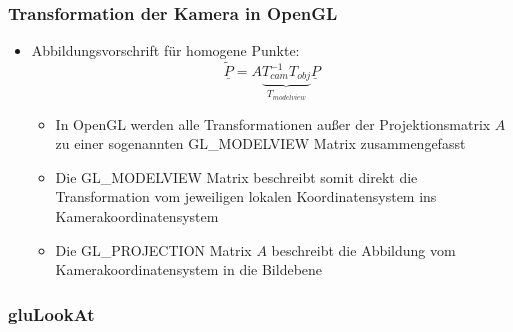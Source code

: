 \documentclass{scrartcl}
\begin{document}
\subsubsection{Transformation der Kamera in OpenGL}

\begin{itemize}
	\item Abbildungsvorschrift für homogene Punkte:
	\begin{equation}
		\underline{\widetilde{P}} = A  \underbrace{T_{cam}^{-1} T_{obj}}_{T_{modelview}}  \underline{P}
	\end{equation}
	\begin{itemize}
		\item In OpenGL werden alle Transformationen außer der Projektionsmatrix $A$ zu einer sogenannten GL\_MODELVIEW Matrix zusammengefasst
		\item Die GL\_MODELVIEW Matrix beschreibt somit direkt die Transformation vom jeweiligen lokalen Koordinatensystem ins Kamerakoordinatensystem
		\item Die GL\_PROJECTION Matrix $A$ beschreibt die Abbildung vom Kamerakoordinatensystem in die Bildebene
	\end{itemize}
\end{itemize}

\subsubsection{gluLookAt}
\end{document}

